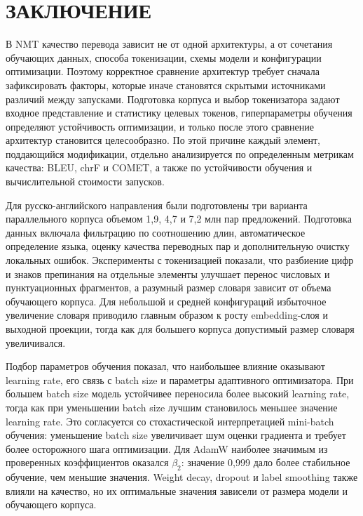 \section*{ЗАКЛЮЧЕНИЕ}

В NMT качество перевода зависит не от одной архитектуры, а от сочетания обучающих данных, способа токенизации, схемы модели и конфигурации оптимизации. Поэтому корректное сравнение архитектур требует сначала зафиксировать факторы, которые иначе становятся скрытыми источниками различий между запусками. Подготовка корпуса и выбор токенизатора задают входное представление и статистику целевых токенов, гиперпараметры обучения определяют устойчивость оптимизации, и только после этого сравнение архитектур становится целесообразно. По этой причине каждый элемент, поддающийся модификации, отдельно анализируется по определенным метрикам качества: BLEU, chrF и COMET, а также по устойчивости обучения и вычислительной стоимости запусков.

Для русско-английского направления были подготовлены три варианта параллельного корпуса объемом 1{,}9, 4{,}7 и 7{,}2 млн пар предложений. Подготовка данных включала фильтрацию по соотношению длин, автоматическое определение языка, оценку качества переводных пар и дополнительную очистку локальных ошибок. Эксперименты с токенизацией показали, что разбиение цифр и знаков препинания на отдельные элементы улучшает перенос числовых и пунктуационных фрагментов, а разумный размер словаря зависит от объема обучающего корпуса. Для небольшой и средней конфигураций избыточное увеличение словаря приводило главным образом к росту embedding-слоя и выходной проекции, тогда как для большего корпуса допустимый размер словаря увеличивался.

Подбор параметров обучения показал, что наибольшее влияние оказывают learning rate, его связь с batch size и параметры адаптивного оптимизатора. При большем batch size модель устойчивее переносила более высокий learning rate, тогда как при уменьшении batch size лучшим становилось меньшее значение learning rate. Это согласуется со стохастической интерпретацией mini-batch обучения: уменьшение batch size увеличивает шум оценки градиента и требует более осторожного шага оптимизации. Для AdamW наиболее значимым из проверенных коэффициентов оказался $\beta_2$: значение 0{,}999 дало более стабильное обучение, чем меньшие значения. Weight decay, dropout и label smoothing также влияли на качество, но их оптимальные значения зависели от размера модели и обучающего корпуса.


